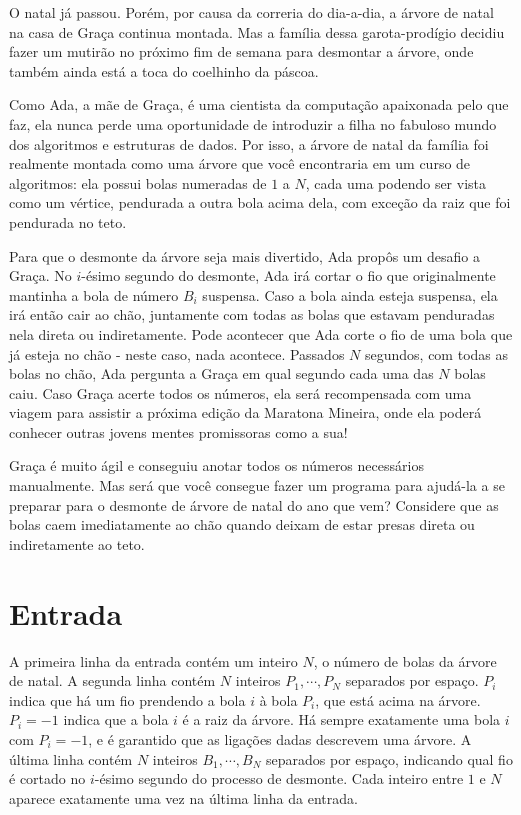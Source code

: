 O natal já passou. Porém, por causa da correria do dia-a-dia, a árvore de natal na casa de Graça continua montada.
Mas a família dessa garota-prodígio decidiu fazer um mutirão no próximo fim de semana para desmontar a árvore,
onde também ainda está a toca do coelhinho da páscoa.

Como Ada, a mãe de Graça, é uma cientista da computação apaixonada pelo que faz,
ela nunca perde uma oportunidade de introduzir a filha
no fabuloso mundo dos algoritmos e estruturas de dados.
Por isso, a árvore de natal da família foi realmente montada como uma árvore
que você encontraria em um curso de algoritmos: ela possui bolas numeradas de $1$ a $N$, cada uma
podendo ser vista como um vértice, pendurada a outra bola acima dela,
com exceção da raiz que foi pendurada no teto.

Para que o desmonte da árvore seja mais divertido, Ada propôs um desafio a Graça.
No $i$-ésimo segundo do desmonte, Ada irá cortar o fio que originalmente mantinha a bola de número $B_i$ suspensa.
Caso a bola ainda esteja suspensa, ela irá então cair ao chão, juntamente com todas as bolas que estavam
penduradas nela direta ou indiretamente.
Pode acontecer que Ada corte o fio de uma bola que já esteja no chão - neste caso, nada acontece.
Passados $N$ segundos, com todas as bolas no chão, Ada pergunta a Graça em qual segundo cada uma das $N$
bolas caiu.
Caso Graça acerte todos os números, ela será recompensada com uma viagem para assistir a próxima
edição da Maratona Mineira, onde ela poderá conhecer outras jovens mentes promissoras como a sua!

Graça é muito ágil e conseguiu anotar todos os números necessários manualmente. Mas será que você
consegue fazer um programa para ajudá-la a se preparar para o desmonte de árvore de natal do ano que vem?
Considere que as bolas caem imediatamente ao chão quando deixam de estar presas direta ou indiretamente ao teto.

\section*{Entrada}

A primeira linha da entrada contém um inteiro $N$, o número de bolas da árvore de natal.
A segunda linha contém $N$ inteiros $P_1, \cdots, P_N$ separados por espaço.
$P_i$ indica que há um fio prendendo a bola $i$ à bola $P_i$, que está acima na árvore.
$P_i = -1$ indica que a bola $i$ é a raiz da árvore.
Há sempre exatamente uma bola $i$ com 
$P_i = -1$, e é garantido que as ligações dadas descrevem uma árvore.
A última linha contém $N$ inteiros $B_1, \cdots, B_N$ separados por espaço, indicando qual fio é
cortado no $i$-ésimo segundo do processo de desmonte.
Cada inteiro entre $1$ e $N$ aparece exatamente uma vez na última linha da entrada.

